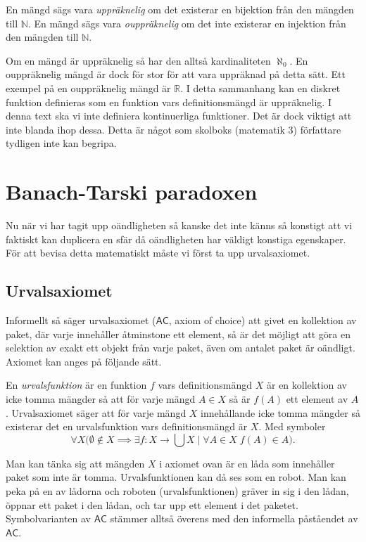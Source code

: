 \documentclass{article}
\theoremstyle{definition}
\begin{document}
\begin{mydef}{}{}
  En mängd sägs vara \textit{uppräknelig} om det existerar en bijektion från den mängden till $\mathbb{N}$. En mängd sägs vara 
  \textit{ouppräknelig} om det inte existerar en injektion från den mängden till $\mathbb{N}$.
\end{mydef}
Om en mängd är uppräknelig så har den alltså kardinaliteten $\aleph_0$. En 
\linebreak
ouppräknelig mängd är dock för stor för att vara uppräknad på 
detta sätt. Ett exempel på en ouppräknelig mängd är $\mathbb{R}$. I detta sammanhang kan en diskret funktion definieras som 
en funktion vars definitionsmängd är uppräknelig. I denna text ska vi inte definiera kontinuerliga funktioner. Det 
är dock viktigt att inte blanda ihop dessa. Detta är något som skolboks (matematik 3) författare tydligen inte kan begripa. 

\section{Banach-Tarski paradoxen}
Nu när vi har tagit upp oändligheten så kanske det inte känns så konstigt att vi faktiskt kan duplicera en sfär då 
oändligheten har väldigt konstiga egenskaper. För att bevisa detta matematiskt måste vi först ta upp urvalsaxiomet.
\subsection{Urvalsaxiomet}
Informellt så säger urvalsaxiomet ($\mathsf{AC}$, axiom of choice) att givet en kollektion av paket, där varje innehåller åtminstone ett element, så 
är det möjligt att göra en selektion av exakt ett objekt från varje paket, även om antalet paket är oändligt. Axiomet kan anges på följande sätt.

\begin{myaxiom}{}{}
  En \textit{urvalsfunktion} är en funktion $f$ vars definitionsmängd $X$ är en kollektion av icke tomma mängder så att för varje 
  mängd $A \in X$ så är $f(A)$ ett element av $A$. Urvalsaxiomet säger att för varje mängd $X$ innehållande icke tomma mängder så existerar 
  det en urvalsfunktion vars definitionsmängd är $X$. Med symboler 
  \[ \forall X \biggl( \emptyset \notin X \implies \exists f: X \rightarrow \bigcup X \; | \; \forall A \in X \; f(A) \in A  \biggr).\]
\end{myaxiom}
Man kan tänka sig att mängden $X$ i axiomet ovan är en låda som innehåller paket som inte är tomma. Urvalsfunktionen kan då ses som en robot. 
Man kan peka på en av lådorna och roboten (urvalsfunktionen) gräver in sig i den lådan, öppnar ett paket i den lådan, och tar upp ett element i 
det paketet. Symbolvarianten av $\mathsf{AC}$ stämmer alltså överens med den informella påståendet av $\mathsf{AC}$. 
\end{document}
